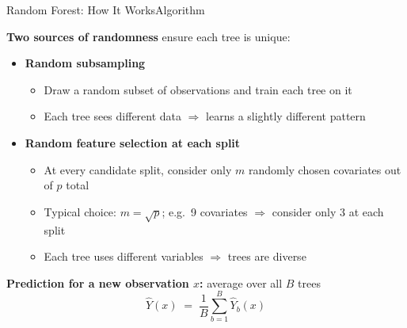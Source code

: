 \documentclass[dvipsnames,hyperref={pdfpagelabels=false}]{beamer}
\begin{document}
\begin{frame}{Random Forest: How It Works}{Algorithm}

\textbf{Two sources of randomness} ensure each tree is unique:
\vspace{0.2cm}
\begin{itemize}
  \item[\textbf{1.}] \textbf{Random subsampling}
  \begin{itemize}
    \vspace{0.1cm}
    \item Draw a random subset of observations and train each tree on it
    \vspace{0.1cm}
    \item Each tree sees different data $\Rightarrow$ learns a slightly different pattern
  \end{itemize}
  \vspace{0.25cm}
  \item[\textbf{2.}] \textbf{Random feature selection at each split}
  \begin{itemize}
    \vspace{0.1cm}
    \item At every candidate split, consider only $m$ randomly chosen covariates out of $p$ total
    \vspace{0.1cm}
    \item Typical choice: $m = \sqrt{p}$; \enspace e.g.\ 9 covariates $\Rightarrow$ consider only 3 at each split
    \vspace{0.1cm}
    \item Each tree uses different variables $\Rightarrow$ trees are diverse
  \end{itemize}
\end{itemize}

\vspace{0.35cm}
\textbf{Prediction for a new observation $x$:} average over all $B$ trees
\begin{equation*}
  \hat{Y}(x) \;=\; \frac{1}{B}\sum_{b=1}^{B} \hat{Y}_{b}(x)
\end{equation*}
\end{frame}
\end{document}

